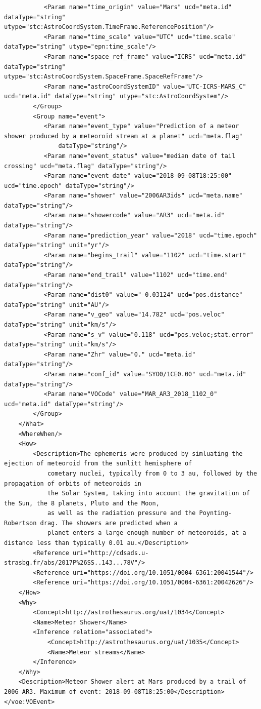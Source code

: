 \documentclass[referee,a4paper,12pt,traditabstract]{swsc}
\begin{document}
\begin{linenumbers}
{\begin{verbatim}
           <Param name="time_origin" value="Mars" ucd="meta.id" dataType="string" utype="stc:AstroCoordSystem.TimeFrame.ReferencePosition"/>
           <Param name="time_scale" value="UTC" ucd="time.scale" dataType="string" utype="epn:time_scale"/>
           <Param name="space_ref_frame" value="ICRS" ucd="meta.id" dataType="string" utype="stc:AstroCoordSystem.SpaceFrame.SpaceRefFrame"/>
           <Param name="astroCoordSystemID" value="UTC-ICRS-MARS_C" ucd="meta.id" dataType="string" utype="stc:AstroCoordSystem"/>
        </Group>
        <Group name="event">
           <Param name="event_type" value="Prediction of a meteor shower produced by a meteoroid stream at a planet" ucd="meta.flag" 
               dataType="string"/>
           <Param name="event_status" value="median date of tail crossing" ucd="meta.flag" dataType="string"/>
           <Param name="event_date" value="2018-09-08T18:25:00" ucd="time.epoch" dataType="string"/>
           <Param name="shower" value="2006AR3ids" ucd="meta.name" dataType="string"/>
           <Param name="showercode" value="AR3" ucd="meta.id" dataType="string"/>
           <Param name="prediction_year" value="2018" ucd="time.epoch" dataType="string" unit="yr"/>
           <Param name="begins_trail" value="1102" ucd="time.start" dataType="string"/>
           <Param name="end_trail" value="1102" ucd="time.end" dataType="string"/>
           <Param name="dist0" value="-0.03124" ucd="pos.distance" dataType="string" unit="AU"/>
           <Param name="v_geo" value="14.782" ucd="pos.veloc" dataType="string" unit="km/s"/>
           <Param name="s_v" value="0.118" ucd="pos.veloc;stat.error" dataType="string" unit="km/s"/>
           <Param name="Zhr" value="0." ucd="meta.id" dataType="string"/>
           <Param name="conf_id" value="SYO0/1CE0.00" ucd="meta.id" dataType="string"/>
           <Param name="VOCode" value="MAR_AR3_2018_1102_0" ucd="meta.id" dataType="string"/>
        </Group>
    </What>
    <WhereWhen/>
    <How>
        <Description>The ephemeris were produced by simluating the ejection of meteoroid from the sunlitt hemisphere of 
            cometary nuclei, typically from 0 to 3 au, followed by the propagation of orbits of meteoroids in 
            the Solar System, taking into account the gravitation of the Sun, the 8 planets, Pluto and the Moon, 
            as well as the radiation pressure and the Poynting-Robertson drag. The showers are predicted when a 
            planet enters a large enough number of meteoroids, at a distance less than typically 0.01 au.</Description>
        <Reference uri="http://cdsads.u-strasbg.fr/abs/2017P%26SS..143...78V"/>
        <Reference uri="https://doi.org/10.1051/0004-6361:20041544"/>
        <Reference uri="https://doi.org/10.1051/0004-6361:20042626"/>
    </How>
    <Why>
        <Concept>http://astrothesaurus.org/uat/1034</Concept>
        <Name>Meteor Shower</Name>
        <Inference relation="associated">
            <Concept>http://astrothesaurus.org/uat/1035</Concept>
            <Name>Meteor streams</Name>
        </Inference>        
    </Why>
    <Description>Meteor Shower alert at Mars produced by a trail of 2006 AR3. Maximum of event: 2018-09-08T18:25:00</Description>
</voe:VOEvent>
\end{verbatim}
}


\end{linenumbers}
\end{document}
